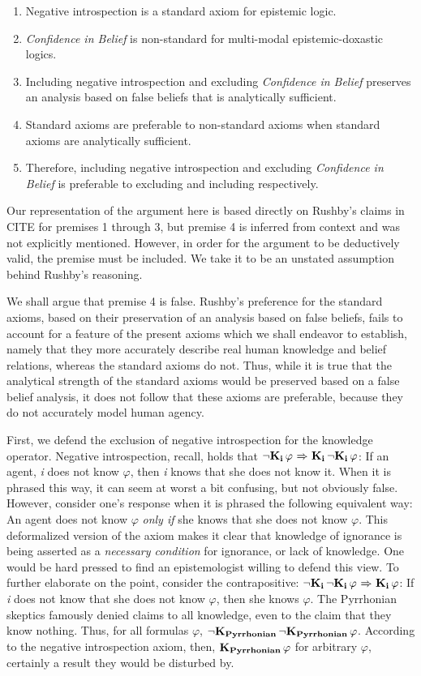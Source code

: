 \begin{enumerate}
	\item Negative introspection is a standard axiom for epistemic logic.
	\item \emph{Confidence in Belief} is non-standard for multi-modal epistemic-doxastic logics.
	\item Including negative introspection and excluding \emph{Confidence in Belief} preserves an analysis based on false beliefs that is analytically sufficient.
	\item Standard axioms are preferable to non-standard axioms when standard axioms are analytically sufficient.
	\item Therefore, including negative introspection and excluding \emph{Confidence in Belief} is preferable to excluding and including respectively.
\end{enumerate}

Our representation of the argument here is based directly on Rushby's claims in CITE for premises 1 through 3, but premise 4 is inferred from context and was not explicitly mentioned. However, in order for the argument to be deductively valid, the premise must be included. We take it to be an unstated assumption behind Rushby's reasoning.

We shall argue that premise 4 is false. Rushby's preference for the standard axioms, based on their preservation of an analysis based on false beliefs, fails to account for a feature of the present axioms which we shall endeavor to establish, namely that they more accurately describe real human knowledge and belief relations, whereas the standard axioms do not. Thus, while it is true that the analytical strength of the standard axioms would be preserved based on a false belief analysis, it does not follow that these axioms are preferable, because they do not accurately model human agency.

First, we defend the exclusion of negative introspection for the knowledge operator. Negative introspection, recall, holds that ${\neg}\mathbf{K}_{\mathbf{i}}\,\varphi{\ \Rightarrow \ }\mathbf{K}_{\mathbf{i}}\,{\neg}\mathbf{K}_{\mathbf{i}}\,\varphi$: If an agent, \emph{i} does not know $\varphi$, then \emph{i} knows that she does not know it. When it is phrased this way, it can seem at worst a bit confusing, but not obviously false. However, consider one's response when it is phrased the following equivalent way: An agent does not know $\varphi$ \emph{only if} she knows that she does not know $\varphi$. This deformalized version of the axiom makes it clear that knowledge of ignorance is being asserted as a \emph{necessary condition} for ignorance, or lack of knowledge. One would be hard pressed to find an epistemologist willing to defend this view. To further elaborate on the point, consider the contrapositive: ${\neg}\mathbf{K}_{\mathbf{i}}\,{\neg}\mathbf{K}_{\mathbf{i}}\,\varphi {\ \Rightarrow \ } \mathbf{K}_{\mathbf{i}}\,\varphi$: If \emph{i} does not know that she does not know $\varphi$, then she knows $\varphi$. The Pyrrhonian skeptics famously denied claims to all knowledge, even to the claim that they know nothing. Thus, for all formulas $\varphi$, ${\neg}\mathbf{K}_{\mathbf{Pyrrhonian}}\,{\neg}\mathbf{K}_{\mathbf{Pyrrhonian}}\,\varphi$. According to the negative introspection axiom, then, $\mathbf{K}_{\mathbf{Pyrrhonian}}\,\varphi$ for arbitrary $\varphi$, certainly a result they would be disturbed by.

